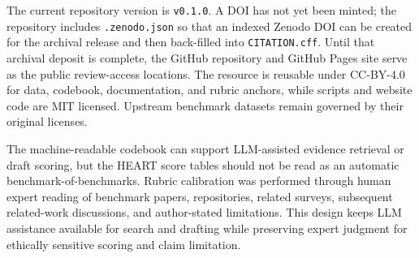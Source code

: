 The current repository version is \texttt{v0.1.0}. A DOI has not yet been
minted; the repository includes \texttt{.zenodo.json} so that an indexed
Zenodo DOI can be created for the archival release and then back-filled into
\texttt{CITATION.cff}. Until that archival deposit is complete, the GitHub
repository and GitHub Pages site serve as the public review-access locations.
The resource is reusable under CC-BY-4.0 for data, codebook, documentation,
and rubric anchors, while scripts and website code are MIT licensed. Upstream
benchmark datasets remain governed by their original licenses.

The machine-readable codebook can support LLM-assisted evidence retrieval or
draft scoring, but the HEART score tables should not be read as an automatic
benchmark-of-benchmarks. Rubric calibration was performed through human expert
reading of benchmark papers, repositories, related surveys, subsequent
related-work discussions, and author-stated limitations. This design keeps
LLM assistance available for search and drafting while preserving expert
judgment for ethically sensitive scoring and claim limitation.
